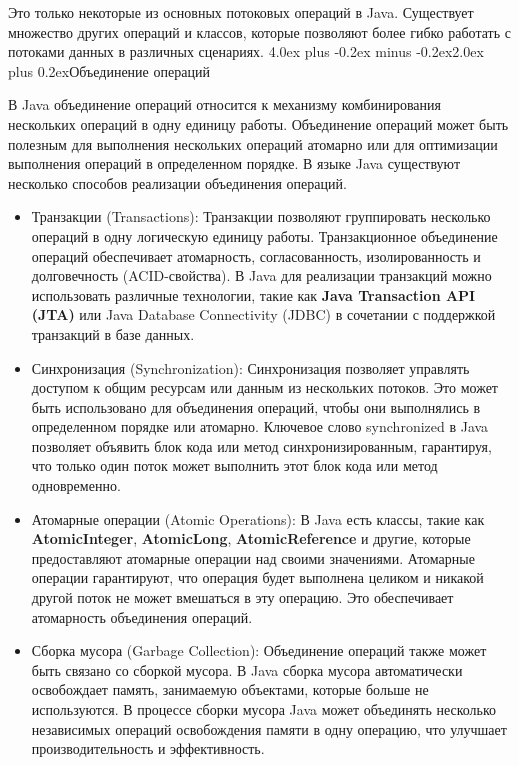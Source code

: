 \documentclass[12pt, a4paper]{book}%
\makeatletter
\renewcommand{\section}{\@startsection{section}{1}{1pt}%
{4.0ex plus -0.2ex minus -0.2ex}{2.0ex plus 0.2ex}{\centering\bf}}%
\makeatother
\begin{document}
{Это только некоторые из основных потоковых операций в Java. Существует множество других операций и классов, которые позволяют более гибко работать с потоками данных в различных сценариях.
\section{Объединение операций}

В Java объединение операций относится к механизму комбинирования нескольких операций в одну единицу работы. Объединение операций может быть полезным для выполнения нескольких операций атомарно или для оптимизации выполнения операций в определенном порядке. В языке Java существуют несколько способов реализации объединения операций.

\begin{itemize}
\item Транзакции (Transactions): Транзакции позволяют группировать несколько операций в одну логическую единицу работы. Транзакционное объединение операций обеспечивает атомарность, согласованность, изолированность и долговечность (ACID-свойства). В Java для реализации транзакций можно использовать различные технологии, такие как {\bf Java Transaction API (JTA)} или Java Database Connectivity (JDBC) в сочетании с поддержкой транзакций в базе данных.

\item Синхронизация (Synchronization): Синхронизация позволяет управлять доступом к общим ресурсам или данным из нескольких потоков. Это может быть использовано для объединения операций, чтобы они выполнялись в определенном порядке или атомарно. Ключевое слово synchronized в Java позволяет объявить блок кода или метод синхронизированным, гарантируя, что только один поток может выполнить этот блок кода или метод одновременно.
\item Атомарные операции (Atomic Operations): В Java есть классы, такие как {\bf AtomicInteger}, 
{\bf AtomicLong}, {\bf AtomicReference} и другие, которые предоставляют атомарные операции над своими значениями. Атомарные операции гарантируют, что операция будет выполнена целиком и никакой другой поток не может вмешаться в эту операцию. Это обеспечивает атомарность объединения операций.
\item Сборка мусора (Garbage Collection): Объединение операций также может быть связано со сборкой мусора. В Java сборка мусора автоматически освобождает память, занимаемую объектами, которые больше не используются. В процессе сборки мусора Java может объединять несколько независимых операций освобождения памяти в одну операцию, что улучшает производительность и эффективность.
\end{itemize}

}
\end{document}
